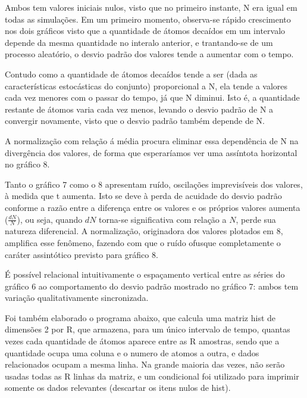 \documentclass{article}
\begin{document}
Ambos tem valores iniciais nulos, visto que no primeiro instante, N era igual em todas as simulações. Em um primeiro momento, observa-se rápido crescimento nos dois gráficos visto que a quantidade de átomos decaídos em um intervalo depende da mesma quantidade no interalo anterior, e trantando-se de um processo aleatório, o desvio padrão dos valores tende a aumentar com o tempo.\par
Contudo como a quantidade de átomos decaídos tende a ser (dada as características estocásticas do conjunto) proporcional a N, ela tende a valores cada vez menores com o passar do tempo, já que N diminui. Isto é, a quantidade restante de átomos varia cada vez menos, levando o desvio padrão de N a convergir novamente, visto que o desvio padrão também depende de N.\par
A normalização com relação á média procura eliminar essa dependência de N na divergência dos valores, de forma que esperaríamos ver uma assíntota horizontal no gráfico 8.\par

Tanto o gráfico 7 como o 8 apresentam ruído, oscilações imprevisíveis dos valores, à medida que t aumenta. Isto se deve à perda de acuidade do desvio padrão conforme a razão entre a diferença entre os valores e os próprios valores aumenta ($\frac{dN}{N}$), ou seja, quando $dN$ torna-se significativa com relação a $N$, perde sua natureza diferencial. A normalização, originadora dos valores plotados em 8, amplifica esse fenômeno, fazendo com que o ruído ofusque completamente o caráter assintótico previsto para gráfico 8.\par

É possível relacional intuitivamente o espaçamento vertical entre as séries do gráfico 6 ao comportamento do desvio padrão mostrado no gráfico 7: ambos tem variação qualitativamente sincronizada.\par

Foi também elaborado o programa abaixo, que calcula uma matriz hist de dimensões 2 por R, que armazena, para um único intervalo de tempo, quantas vezes cada quantidade de átomos aparece entre as R amostras, sendo que a quantidade ocupa uma coluna e o numero de atomos a outra, e dados relacionados ocupam a mesma linha. Na grande maioria das vezes, não serão usadas todas as R linhas da matriz, e um condicional foi utilizado para imprimir somente os dados relevantes (descartar os itens nulos de hist).
\end{document}
